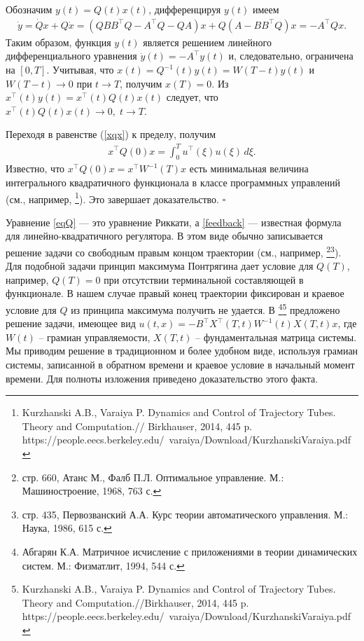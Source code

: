 \documentclass[../main.tex]{subfiles}
\begin{document}
	Обозначим $y(t)=Q(t)x(t)$, дифференцируя $y(t)$ имеем
	\begin{gather*}
		\dot{y}=\dot{Q}x+Q\dot{x}= ( Q B B^{\top} Q - A^{\top}Q - Q A)x+Q(A - B B^{\top} Q ) x=-A^\top Q x.
	\end{gather*}
	Таким образом, функция $y(t)$ является решением линейного дифференциального уравнения $\dot{y}(t)=-A^\top y(t)$ и, следовательно, ограничена на $[0,T]$. Учитывая, что
	$
	x(t)=Q^{-1}(t)y(t)=W(T-t)y(t)$
	и $W(T-t)\to 0$ при $t\to T$, получим $x(T)=0$. 
	Из $x^\top(t)y(t)=x^\top(t)Q(t)x(t)$ 
	следует, что $x^\top(t)Q(t)x(t) \to 0,\;t\to T $.
	
	Переходя в равенстве (\ref{xqx}) к пределу, получим
	\begin{gather*}
	x^{\top} Q(0)x = \int_{0}^{T} u^{\top}(\xi)  u(\xi) \, d\xi.
	\end{gather*}
	Известно, что $x^{\top} Q(0)x=x^{\top} W^{-1}(T)x$ есть минимальная величина интегрального квадратичного функционала в классе программных управлений (см., например, \footnote{Kurzhanski A.B., Varaiya P. Dynamics and Control of Trajectory Tubes. Theory and Computation.// Birkhauser, 2014, 445 p.\\ https://people.eecs.berkeley.edu/~varaiya/Download/KurzhanskiVaraiya.pdf}). Это завершает доказательство.  
	\hfill $\square$
	\begin{zam}
	Уравнение \eqref{eqQ} --- это уравнение Риккати, а  \eqref{feedback} --- известная формула для линейно-квадратичного регулятора. В этом виде обычно записывается решение задачи  со свободным правым концом траектории (см., например, \footnote{стр. 660, Атанс М., Фалб П.Л. Оптимальное управление. М.: Машиностроение, 1968, 763 с.}\footnote{стр. 435, Первозванский А.А. Курс теории автоматического управления. М.: Наука, 1986, 615 с.}). Для подобной задачи  принцип максимума Понтрягина  дает  условие для $Q(T)$, например,  $Q(T)=0$ при отсутствии терминальной составляющей в функционале. В нашем случае правый конец траектории фиксирован и краевое условие для $Q$ из принципа максимума получить не удается. В  \footnote{Абгарян К.А. Матричное исчисление с приложениями в теории динамических систем. М.: Физматлит, 1994, 544 с.}\footnote{Kurzhanski A.B., Varaiya P. Dynamics and Control of Trajectory Tubes. Theory and Computation.//Birkhauser, 2014, 445 p.\\ https://people.eecs.berkeley.edu/~varaiya/Download/KurzhanskiVaraiya.pdf} предложено решение задачи, имеющее вид $u(t,x)=-B^{\top} X^{\top}(T,t)W^{-1}(t) X(T,t)x$, где $W(t)$ -- грамиан управляемости, $X(T,t)$ -- фундаментальная матрица системы. Мы приводим решение в традиционном и  более удобном виде,  используя  грамиан системы, записанной в обратном времени и краевое условие в начальный момент времени. Для полноты изложения приведено доказательство этого факта. 
	\end{zam}
\end{document}
